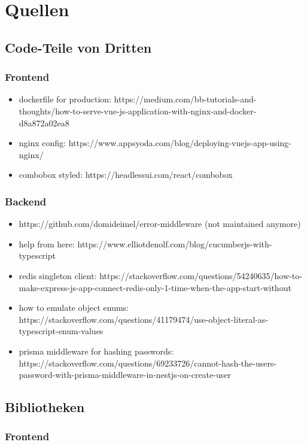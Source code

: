 \documentclass[a4paper, 12pt]{article}
\begin{document}
    \newpage
    \section{Quellen}
    \subsection{Code-Teile von Dritten}
    \subsubsection{Frontend}
\begin{itemize}
  \item dockerfile for production: https://medium.com/bb-tutorials-and-thoughts/how-to-serve-vue-js-application-with-nginx-and-docker-d8a872a02ea8
  \item nginx config: https://www.appsyoda.com/blog/deploying-vuejs-app-using-nginx/
  \item combobox styled: https://headlessui.com/react/combobox
\end{itemize}

    \subsubsection{Backend}

\begin{itemize}
  \item https://github.com/domideimel/error-middleware  (not maintained anymore)
  \item help from here: https://www.elliotdenolf.com/blog/cucumberjs-with-typescript
  \item redis singleton client: https://stackoverflow.com/questions/54240635/how-to-make-express-js-app-connect-redis-only-1-time-when-the-app-start-without
  \item how to emulate object enums: https://stackoverflow.com/questions/41179474/use-object-literal-as-typescript-enum-values
  \item prisma middleware for hashing passwords: https://stackoverflow.com/questions/69233726/cannot-hash-the-users-password-with-prisma-middleware-in-nestjs-on-create-user
\end{itemize}

    \newpage
    \subsection{Bibliotheken}
    \subsubsection{Frontend}
\end{document}
